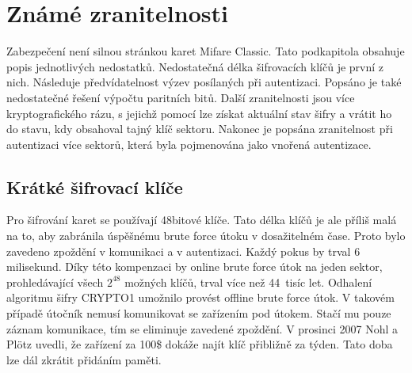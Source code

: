 \chapter{Známé zranitelnosti}
\label{zranitelnosti}
Zabezpečení není silnou stránkou karet Mifare Classic. Tato podkapitola obsahuje popis jednotlivých nedostatků. Nedostatečná délka šifrovacích klíčů je první z nich. Následuje předvídatelnost výzev posílaných při autentizaci. Popsáno je také nedostatečné řešení výpočtu paritních bitů. Další zranitelnosti jsou více kryptografického rázu, s jejichž pomocí lze získat aktuální stav šifry a vrátit ho do stavu, kdy obsahoval tajný klíč sektoru. Nakonec je popsána zranitelnost při autentizaci více sektorů, která byla pojmenována jako vnořená autentizace.
\par
\section{Krátké šifrovací klíče}
Pro šifrování karet se používají 48bitové klíče. Tato délka klíčů je ale příliš malá na to, aby zabránila úspěšnému brute force útoku v dosažitelném čase. Proto bylo zavedeno zpoždění v komunikaci a v autentizaci. Každý pokus by trval 6 milisekund. Díky této kompenzaci by online brute force útok na jeden sektor, prohledávající všech $2^{48}$ možných klíčů, trval více než 44~tisíc let. Odhalení algoritmu šifry CRYPTO1 umožnilo provést offline brute force útok. V takovém případě útočník nemusí komunikovat se zařízením pod útokem. Stačí mu pouze záznam komunikace, tím se eliminuje zavedené zpoždění. V prosinci 2007 Nohl a Plötz uvedli, že zařízení za 100\$ dokáže najít klíč přibližně za týden. Tato doba lze dál zkrátit přidáním paměti\cite{Cryptanalisis}.
\par
